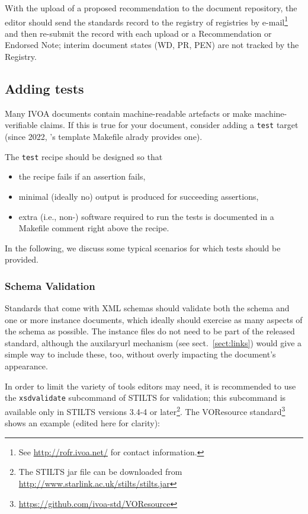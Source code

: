\documentclass[11pt,a4paper]{ivoa}
\begin{document}
With the upload of a proposed recommendation to the document repository,
the editor should send the standards record to the registry of
registries by e-mail\footnote{See \url{http://rofr.ivoa.net/} for
contact information.} and then re-submit the record with each upload or
a Recommendation or Endorsed Note; interim document states (WD, PR, PEN)
are not tracked by the Registry.


\subsection{Adding tests}

Many IVOA documents contain machine-readable artefacts or make
machine-verifiable claims.  If this is true for your document, consider
adding a \verb|test| target (since 2022, \ivoatex's template Makefile
alrady provides one).

The \verb|test| recipe should be designed so that

\begin{itemize}
\item the recipe fails if an assertion fails,
\item minimal (ideally no) output is produced for succeeding assertions,
\item extra (i.e., non-\ivoatex) software required to run the tests is
documented in a Makefile comment right above the recipe.
\end{itemize}

In the following, we discuss some typical scenarios for which tests
should be provided.

\subsubsection{Schema Validation}

Standards that come with XML schemas should validate both the schema and
one or more instance documents, which ideally should exercise as many
aspects of the schema as possible.  The instance files do not need to be
part of the released standard, although the auxilaryurl mechanism (see
sect.~\ref{sect:links}) would give a simple way to include these, too,
without overly impacting the document's appearance.

In order to limit the variety of tools editors may need, it is
recommended to use the \verb|xsdvalidate| subcommand of STILTS
\citep{2006ASPC..351..666T} for validation; this subcommand is available
only in STILTS versions 3.4-4 or later\footnote{The STILTS jar file can be
downloaded from \url{http://www.starlink.ac.uk/stilts/stilts.jar}}.
The VOResource
standard\footnote{\url{https://github.com/ivoa-std/VOResource}} shows an
example (edited here for clarity):
\end{document}
